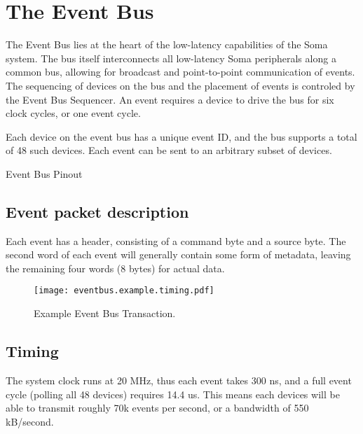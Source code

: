 
\section{The Event Bus}

The Event Bus lies at the heart of the low-latency capabilities of the Soma system. The bus itself interconnects all low-latency Soma peripherals along a common bus, allowing for broadcast and point-to-point communication of events. The sequencing of devices on the bus and the placement of events is controled by the Event Bus Sequencer. An event requires a device to drive the bus for six clock cycles, or one event cycle. 

      Each device on the event bus has a unique event ID, and the bus supports a total of 48 such devices. Each event can be sent to an arbitrary subset of devices.  

\begin{SignalTable}{Event Bus Pinout}





\end{SignalTable}


\subsection{Event packet description}

Each event has a header, consisting of a command byte and a source byte. The second word of each event will generally contain some form of metadata, leaving the remaining four words (8 bytes) for actual data.

\begin{figure}
\texttt{[image: eventbus.example.timing.pdf]}
\caption{Example Event Bus Transaction.}
\end{figure}

\subsection{Timing}
The system clock runs at 20 MHz, thus each event takes 300 ns, and a full event cycle (polling all 48 devices) requires 14.4 us. This means each devices will be able to transmit roughly 70k events per second, or a bandwidth of 550 kB/second. 

